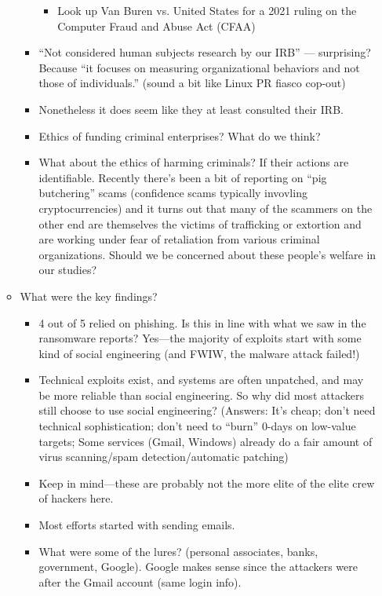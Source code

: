\documentclass[11pt]{article}
\begin{document}
\begin{itemize}
\begin{itemize}
\begin{itemize}
\begin{itemize}
                \item Look up Van Buren vs. United States for a 2021 ruling on the Computer Fraud and Abuse Act (CFAA)
            \end{itemize}
            \item ``Not considered human subjects research by our IRB'' --- surprising? Because ``it focuses on measuring organizational behaviors and not those of individuals.'' (sound a bit like Linux PR fiasco cop-out)
            \item Nonetheless it does seem like they at least consulted their IRB.
            \item Ethics of funding criminal enterprises? What do we think?
            \item What about the ethics of harming criminals? If their actions are identifiable. Recently there's been a bit of reporting on ``pig butchering'' scams (confidence scams typically invovling cryptocurrencies) and it turns out that many of the scammers on the other end are themselves the victims of trafficking or extortion and are working under fear of retaliation from various criminal organizations. Should we be concerned about these people's welfare in our studies? 
        \end{itemize}
        \item What were the key findings?
        \begin{itemize}
            \item 4 out of 5 relied on phishing. Is this in line with what we saw in the ransomware reports? Yes---the majority of exploits start with some kind of social engineering (and FWIW, the malware attack failed!)
            \item Technical exploits exist, and systems are often unpatched, and may be more reliable than social engineering. So why did most attackers still choose to use social engineering? (Answers: It's cheap; don't need technical sophistication; don't need to ``burn'' 0-days on low-value targets; Some services (Gmail, Windows) already do a fair amount of virus scanning/spam detection/automatic patching)
            \item Keep in mind---these are probably not the more elite of the elite crew of hackers here. 
            \item Most efforts started with sending emails.
            \item What were some of the lures? (personal associates, banks, government, Google). Google makes sense since the attackers were after the Gmail account (same login info). 

\end{itemize}
\end{itemize}
\end{itemize}
\end{document}
